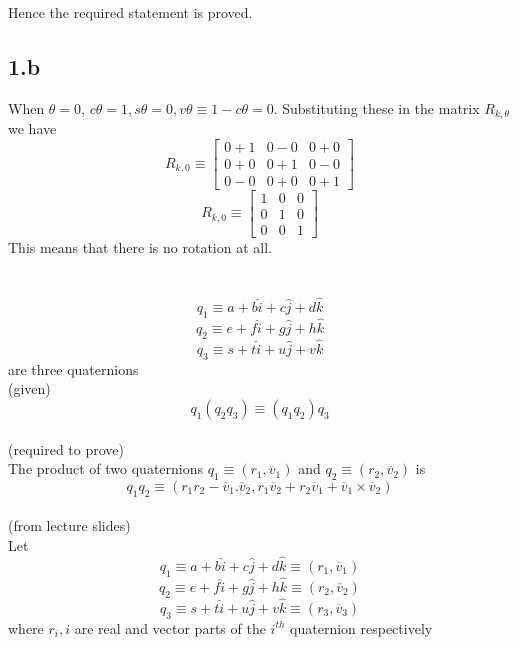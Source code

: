 \documentclass[12pt]{article}
\newcommand{\fromlectures}{{\\ \color{blue} \hspace*{\fill}(from lecture slides)} \\}
\newcommand{\given}{{\\ \color{blue} \hspace*{\fill}(given)} \\}
\newcommand{\rtp}{{\\ \color{blue} \hspace*{\fill}(required to prove)} \\}
\newcommand{\vv}[1]{\overline{v}_{#1}}
\begin{document}
Hence the required statement is proved.

\subsection*{1.b}
When $\theta = 0$, $c\theta = 1, s\theta = 0, v\theta \equiv 1 - c\theta = 0$.
Substituting these in the matrix $ R_{k,\theta} $ we have
\[
  R_{k,0} \equiv
  \begin{bmatrix} 0 + 1 & 0 - 0 & 0 + 0 \\ 0 + 0 & 0 + 1 & 0 - 0 \\ 0 - 0 & 0 + 0 & 0 + 1 \end{bmatrix}
\]
\[
  R_{k,0} \equiv
  \begin{bmatrix} 1 & 0 & 0 \\ 0 & 1 & 0 \\ 0 & 0 & 1 \end{bmatrix}
\]
This means that there is no rotation at all.

\section{}
\section{}
\section{}

\section{}
\[
  q_1 \equiv a + b \hat{i} + c \hat{j} + d \hat{k}
\]
\[
  q_2 \equiv e + f \hat{i} + g \hat{j} + h \hat{k}
\]
\[
  q_3 \equiv s + t \hat{i} + u \hat{j} + v \hat{k}
\]
are three quaternions
\given

\[
  q_1(q_2q_3) \equiv (q_1q_2)q_3
\]
\rtp

The product of two quaternions $ q_1 \equiv (r_1, \vv{1}) $ and $ q_2 \equiv (r_2, \vv{2}) $ is
\[
  q_1q_2 \equiv (r_1 r_2 - \vv{1} . \vv{2}, r_1 \vv{2} + r_2 \vv{1} + \vv{1}\times\vv{2})
\]
\fromlectures

Let
\[
  q_1 \equiv a + b \hat{i} + c \hat{j} + d \hat{k} \equiv (r_1, \vv{1})
\]
\[
  q_2 \equiv e + f \hat{i} + g \hat{j} + h \hat{k} \equiv (r_2, \vv{2})
\]
\[
  q_3 \equiv s + t \hat{i} + u \hat{j} + v \hat{k} \equiv (r_3, \vv{3})
\]
where $r_i, i$ are real and vector parts of the $i^{th}$ quaternion respectively
\end{document}
